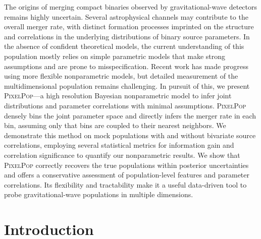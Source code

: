 \label{chapter: pixelpop methods}
\begin{refsection}
\begin{chapterabstract}
The origins of merging compact binaries observed by gravitational-wave detectors remains highly uncertain. Several astrophysical channels may contribute to the overall merger rate, with distinct formation processes imprinted on the structure and correlations in the underlying distributions of binary source parameters. In the absence of confident theoretical models, the current understanding of this population mostly relies on simple parametric models that make strong assumptions and are prone to misspecification. Recent work has made progress using more flexible nonparametric models, but detailed measurement of the multidimensional population remains challenging. In pursuit of this, we present \textsc{PixelPop}---a high resolution Bayesian nonparametric model to infer joint distributions and parameter correlations with minimal assumptions. \textsc{PixelPop} densely bins the joint parameter space and directly infers the merger rate in each bin, assuming only that bins are coupled to their nearest neighbors. We demonstrate this method on mock populations with and without bivariate source correlations, employing several statistical metrics for information gain and correlation significance to quantify our nonparametric results. We show that \textsc{PixelPop} correctly recovers the true populations within posterior uncertainties and offers a conservative assessment of population-level features and parameter correlations. Its flexibility and tractability make it a useful data-driven tool to probe gravitational-wave populations in multiple dimensions.
\end{chapterabstract}

\section{Introduction}


\end{refsection}
